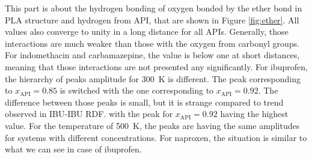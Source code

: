 This part is about the hydrogen bonding of oxygen bonded by the ether bond in PLA structure and hydrogen from API, that are shown in Figure \ref{fig:ether}. All values also converge to unity in a long distance for all APIs. Generally, those interactions are much weaker than those with the oxygen from carbonyl groups. For indomethacin and carbamazepine, the value is below one at short distances, meaning that those interactions are not presented any significantly. For ibuprofen, the hierarchy of peaks amplitude for 300~K is different. The peak corresponding to $x_\text{API}=0.85$ is switched with the one corresponding to $x_\text{API}=0.92$. The difference between those peaks is small, but it is strange compared to trend observed in IBU-IBU RDF. with the peak for $x_\text{API}=0.92$ having the highest value. For the temperature of 500~K, the peaks are having the same amplitudes for systems with different concentrations. For naproxen, the situation is similar to what we can see in case of ibuprofen. 


